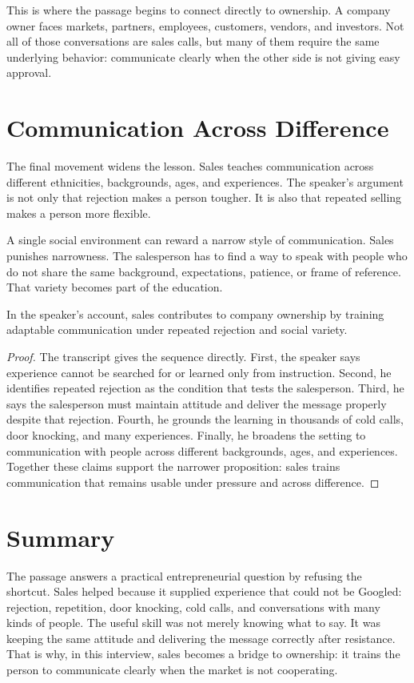 This is where the passage begins to connect directly to ownership. A company owner faces markets, partners, employees, customers, vendors, and investors. Not all of those conversations are sales calls, but many of them require the same underlying behavior: communicate clearly when the other side is not giving easy approval.

\section{Communication Across Difference}

The final movement widens the lesson. Sales teaches communication across different ethnicities, backgrounds, ages, and experiences. The speaker's argument is not only that rejection makes a person tougher. It is also that repeated selling makes a person more flexible.

A single social environment can reward a narrow style of communication. Sales punishes narrowness. The salesperson has to find a way to speak with people who do not share the same background, expectations, patience, or frame of reference. That variety becomes part of the education.

\begin{proposition}
In the speaker's account, sales contributes to company ownership by training adaptable communication under repeated rejection and social variety.
\end{proposition}

\begin{proof}
The transcript gives the sequence directly. First, the speaker says experience cannot be searched for or learned only from instruction. Second, he identifies repeated rejection as the condition that tests the salesperson. Third, he says the salesperson must maintain attitude and deliver the message properly despite that rejection. Fourth, he grounds the learning in thousands of cold calls, door knocking, and many experiences. Finally, he broadens the setting to communication with people across different backgrounds, ages, and experiences. Together these claims support the narrower proposition: sales trains communication that remains usable under pressure and across difference.
\end{proof}

\section{Summary}

The passage answers a practical entrepreneurial question by refusing the shortcut. Sales helped because it supplied experience that could not be Googled: rejection, repetition, door knocking, cold calls, and conversations with many kinds of people. The useful skill was not merely knowing what to say. It was keeping the same attitude and delivering the message correctly after resistance. That is why, in this interview, sales becomes a bridge to ownership: it trains the person to communicate clearly when the market is not cooperating.